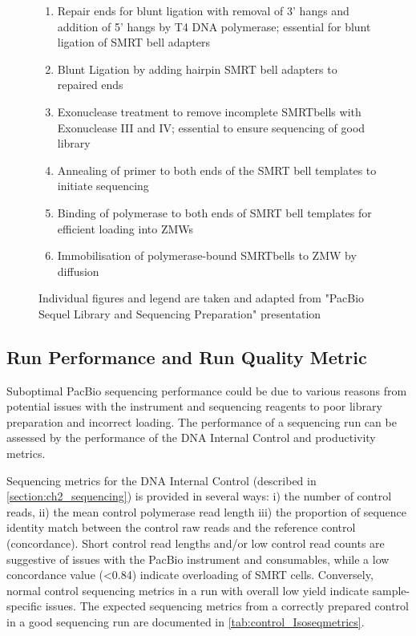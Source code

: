 \begin{figure}[!htp]
{\begin{enumerate}
			\item Repair ends for blunt ligation with removal of 3' hangs and addition of 5' hangs by T4 DNA polymerase; essential for blunt ligation of SMRT bell adapters 
			\item Blunt Ligation by adding hairpin SMRT bell adapters to repaired ends
			\item Exonuclease treatment to remove incomplete SMRTbells with Exonuclease III and IV; essential to ensure sequencing of good library 
			\item Annealing of primer to both ends of the SMRT bell templates to initiate sequencing 
			\item Binding of polymerase to both ends of SMRT bell templates for efficient loading into ZMWs
			\item Immobilisation of polymerase-bound SMRTbells to ZMW by diffusion
			\\
		\end{enumerate} 
		Individual figures and legend are taken and adapted from "PacBio Sequel Library and Sequencing Preparation" presentation
	}
	\label{fig:isoseq_labworkflow}
\end{figure}

\clearpage
\subsection{Run Performance and Run Quality Metric}
Suboptimal PacBio sequencing performance could be due to various reasons from potential issues with the instrument and sequencing reagents to poor library preparation and incorrect loading. The performance of a sequencing run can be assessed by the performance of the DNA Internal Control and productivity metrics. 

Sequencing metrics for the DNA Internal Control (described in \cref{section:ch2_sequencing}) is provided in several ways: i) the number of control reads, ii) the mean control polymerase read length iii) the proportion of sequence identity match between the control raw reads and the reference control (concordance). Short control read lengths and/or low control read counts are suggestive of issues with the PacBio instrument and consumables, while a low concordance value (<0.84) indicate overloading of SMRT cells. Conversely, normal control sequencing metrics in a run with overall low yield indicate sample-specific issues. The expected sequencing metrics from a correctly prepared control in a good sequencing run are documented in \cref{tab:control_Isoseqmetrics}. 

